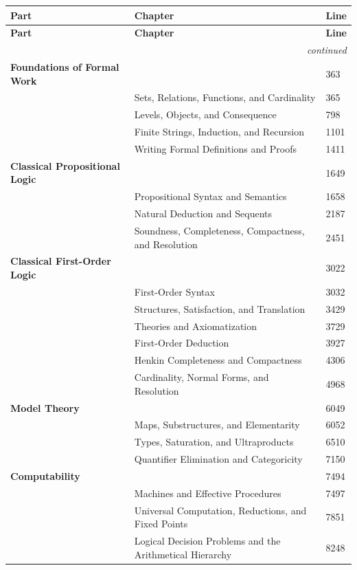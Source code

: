 \begingroup\footnotesize\setlength{\tabcolsep}{3pt}
\begin{longtable}{@{}p{2.1in}p{3.6in}p{0.6in}@{}}
\toprule
\textbf{Part} & \textbf{Chapter} & \textbf{Line} \\
\midrule
\endfirsthead
\toprule
\textbf{Part} & \textbf{Chapter} & \textbf{Line} \\
\midrule
\endhead
\midrule\multicolumn{3}{r}{\emph{continued}}\\\endfoot
\bottomrule\endlastfoot
\textbf{Foundations of Formal Work} &  & 363 \\
 & Sets, Relations, Functions, and Cardinality & 365 \\
 & Levels, Objects, and Consequence & 798 \\
 & Finite Strings, Induction, and Recursion & 1101 \\
 & Writing Formal Definitions and Proofs & 1411 \\
\textbf{Classical Propositional Logic} &  & 1649 \\
 & Propositional Syntax and Semantics & 1658 \\
 & Natural Deduction and Sequents & 2187 \\
 & Soundness, Completeness, Compactness, and Resolution & 2451 \\
\textbf{Classical First-Order Logic} &  & 3022 \\
 & First-Order Syntax & 3032 \\
 & Structures, Satisfaction, and Translation & 3429 \\
 & Theories and Axiomatization & 3729 \\
 & First-Order Deduction & 3927 \\
 & Henkin Completeness and Compactness & 4306 \\
 & Cardinality, Normal Forms, and Resolution & 4968 \\
\textbf{Model Theory} &  & 6049 \\
 & Maps, Substructures, and Elementarity & 6052 \\
 & Types, Saturation, and Ultraproducts & 6510 \\
 & Quantifier Elimination and Categoricity & 7150 \\
\textbf{Computability} &  & 7494 \\
 & Machines and Effective Procedures & 7497 \\
 & Universal Computation, Reductions, and Fixed Points & 7851 \\
 & Logical Decision Problems and the Arithmetical Hierarchy & 8248 \\

\end{longtable}
